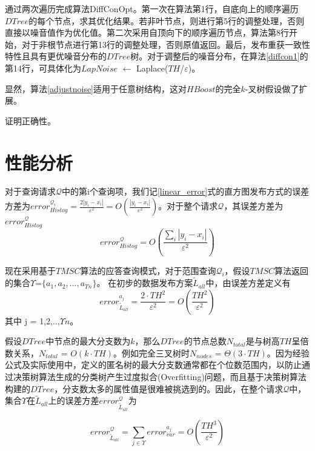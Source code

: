 通过两次遍历完成算法DiffConOpt。第一次在算法第1行，自底向上的顺序遍历$DTree$的每个节点，求其优化结果。若非叶节点，则进行第5行的调整处理，否则直接以噪音值作为优化值。第二次采用自顶向下的顺序遍历节点，算法第8行开始，对于非根节点进行第13行的调整处理，否则原值返回。最后，发布重获一致性特性且具有更优噪音分布的$DTree$树。对于调整后的噪音分布，在算法\ref{diffcon1}的第14行，可具体化为$LapNoise$ $\leftarrow$ Laplace($TH$/$\varepsilon$)。

显然，算法\ref{adjustnoise}适用于任意树结构，这对$HBoost$的完全$k$-叉树假设做了扩展。


证明正确性。  %



\section{性能分析}

对于查询请求$\mathcal{Q}$中的第i个查询项，我们记\ref{linear_error}式的直方图发布方式的误差方差为$error_{Histog}^{\mathcal{Q}_{i}} = \frac{2|y_{i}-x_{i}|}{\varepsilon^2} = O(\frac{|y_{i}-x_{i}|}{\varepsilon^2})$。对于整个请求$\mathcal{Q}$，其误差方差为$error_{Histog}^{\mathcal{Q}}$
\begin{equation}
\label{linear_error2}
error_{Histog}^{\mathcal{Q}} = O(\frac{\sum\limits_i |y_{i}-x_{i}|}{\varepsilon^2})
\end{equation}

现在采用基于$TMSC$算法的应答查询模式，对于范围查询$\mathcal{Q}_{i}$，假设$TMSC$算法返回的集合$\Upsilon$=$\{a_{1},a_{2},...,a_{\Upsilon n}\}$。
在初步的数据发布方案$\tilde{L}_{all}$中，由误差方差定义有
\[
	error_{\tilde{L}_{all}}^{a_{j}} = \frac{2 \cdotp TH^2}{\varepsilon^2} = O(\frac{TH^2}{\varepsilon^2})
\]
其中 j = 1,2,..,$\Upsilon n$。

假设$DTree$中节点的最大分支数为$k$，那么$DTree$的节点总数$N_{total}$是与树高$TH$呈倍数关系，$N_{total}$ = $O(k \cdotp TH)$。例如完全三叉树时$N_{nodes}$ = $\Theta(3 \cdotp TH)$。因为经验公式及实际使用中，定义的匿名树的最大分支数通常都在个位数范围内，以防止通过决策树算法生成的分类树产生过度拟合(Overfitting)\cite{overfitting}问题，而且基于决策树算法构建的$DTree$，分支数太多的属性值是很难被挑选到的。因此，在整个请求$\mathcal{Q}$中，集合$\Upsilon$在$\tilde{L}_{all}$上的误差方差$error_{\tilde{L}_{all}}^{\mathcal{Q}}$为

\[
\label{Lall_error}
error_{\tilde{L}_{all}}^{\mathcal{Q}} = \sum\limits_{j \in \Upsilon} error_{var}^{a_{j}}=O(\frac{TH^3}{\varepsilon^2})
\]

